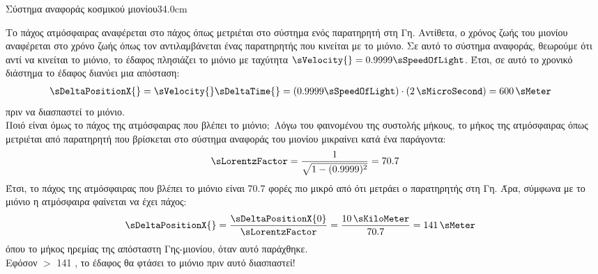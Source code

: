 \begin{MyColumnRight}[detach title,before upper={\tcbtitle\quad}]{Σύστημα αναφοράς κοσμικού μιονίου}{34.0cm}

Tο πάχος ατμόσφαιρας αναφέρεται στο πάχος όπως μετριέται στο σύστημα
ενός παρατηρητή στη Γη. Αντίθετα, ο χρόνος ζωής του μιονίου αναφέρεται
στο χρόνο ζωής όπως τον αντιλαμβάνεται ένας παρατηρητής που κινείται
με το μιόνιο. %
Σε αυτό το σύστημα αναφοράς, θεωρούμε ότι αντί να κινείται το μιόνιο, το έδαφος πλησιάζει το μιόνιο
με ταχύτητα $\sVelocity{} =0.9999 \sSpeedOfLight$. 
Έτσι, σε αυτό το χρονικό διάστημα το έδαφος διανύει μια απόσταση:
\en
\begin{align*}
\sDeltaPositionX{} &= \sVelocity{} \sDeltaTime{} = \left(0.9999 \sSpeedOfLight\right) \cdot \left(2\,\sMicroSecond\right) = 600 \,\sMeter
\end{align*}
\gr
πριν να διασπαστεί το μιόνιο. \\

Ποιό είναι όμως το πάχος της  ατμόσφαιρας που βλέπει το μιόνιο$;$ Λόγω
του φαινομένου της συστολής μήκους, το μήκος της ατμόσφαιρας όπως
μετριέται από παρατηρητή που βρίσκεται στο σύστημα αναφοράς του μιονίου
μικραίνει κατά ένα παράγοντα:
\en
\begin{align*}
\sLorentzFactor = \frac{1}{\sqrt{1-(0.9999)^{2}}} = 70.7
\end{align*}
\gr
Έτσι, το πάχος της ατμόσφαιρας που βλέπει το μιόνιο είναι 70.7 φορές
πιο μικρό από ότι μετράει ο παρατηρητής στη Γη. Άρα, σύμφωνα με το μιόνιο η
ατμόσφαιρα φαίνεται να έχει πάχος:
\en
\begin{align*}
\sDeltaPositionX{} &= \frac{\sDeltaPositionX{0}}{\sLorentzFactor} = \frac{10\,\sKiloMeter}{70.7} = 141 \,\sMeter 
\end{align*}
\gr
όπου  το μήκος ηρεμίας της απόσταστη Γης-μιονίου,
όταν αυτό παράχθηκε. \\

Εφόσον  \sMeter $>$ 141 \sMeter\gr, το έδαφος θα φτάσει το μιόνιο πριν αυτό διασπαστεί!

\end{MyColumnRight}


